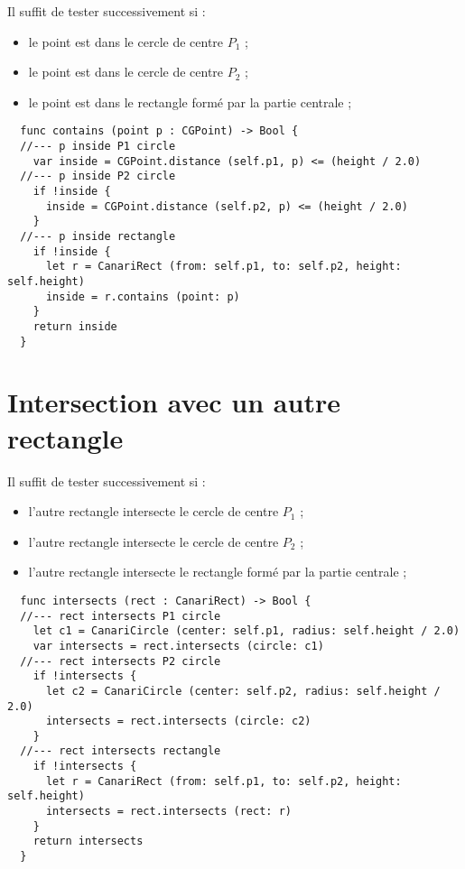 Il suffit de tester successivement si :
\begin{itemize}
  \item le point est dans le cercle de centre $P_1$ ;
  \item le point est dans le cercle de centre $P_2$ ;
  \item le point est dans le rectangle formé par la partie centrale ;
\end{itemize}

\begin{lstlisting}
  func contains (point p : CGPoint) -> Bool {
  //--- p inside P1 circle
    var inside = CGPoint.distance (self.p1, p) <= (height / 2.0)
  //--- p inside P2 circle
    if !inside {
      inside = CGPoint.distance (self.p2, p) <= (height / 2.0)
    }
  //--- p inside rectangle
    if !inside {
      let r = CanariRect (from: self.p1, to: self.p2, height: self.height)
      inside = r.contains (point: p)
    }
    return inside
  }
\end{lstlisting}










\section{Intersection avec un autre rectangle}

Il suffit de tester successivement si :
\begin{itemize}
  \item l'autre rectangle intersecte le cercle de centre $P_1$ ;
  \item l'autre rectangle intersecte le cercle de centre $P_2$ ;
  \item l'autre rectangle intersecte le rectangle formé par la partie centrale ;
\end{itemize}

\begin{lstlisting}
  func intersects (rect : CanariRect) -> Bool {
  //--- rect intersects P1 circle
    let c1 = CanariCircle (center: self.p1, radius: self.height / 2.0)
    var intersects = rect.intersects (circle: c1)
  //--- rect intersects P2 circle
    if !intersects {
      let c2 = CanariCircle (center: self.p2, radius: self.height / 2.0)
      intersects = rect.intersects (circle: c2)
    }
  //--- rect intersects rectangle
    if !intersects {
      let r = CanariRect (from: self.p1, to: self.p2, height: self.height)
      intersects = rect.intersects (rect: r)
    }
    return intersects
  }
\end{lstlisting}






